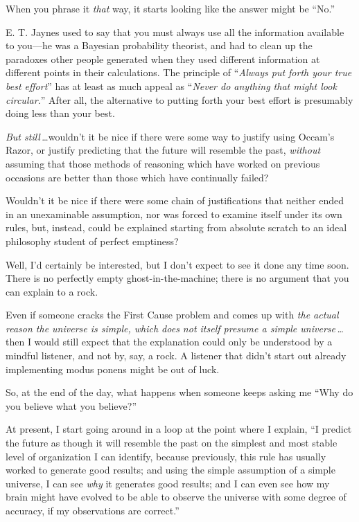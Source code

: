  When you phrase it \textit{that} way, it starts looking like the
answer might be ``No.''


 E. T. Jaynes used to say that you must always use all the
information available to you---he was a Bayesian probability theorist,
and had to clean up the paradoxes other people generated when they used
different information at different points in their calculations. The
principle of ``\textit{Always put forth your true best
effort}'' has at least as much appeal as
``\textit{Never do anything that might look
circular.}'' After all, the alternative to putting
forth your best effort is presumably doing less than your best.


 \textit{But still}\,\ldots wouldn't it be nice if
there were some way to justify using Occam's Razor, or
justify predicting that the future will resemble the past,
\textit{without} assuming that those methods of reasoning which have
worked on previous occasions are better than those which have
continually failed?


 Wouldn't it be nice if there were some chain of
justifications that neither ended in an unexaminable assumption, nor
was forced to examine itself under its own rules, but, instead, could
be explained starting from absolute scratch to an ideal philosophy
student of perfect emptiness?


 Well, I'd certainly be interested, but I
don't expect to see it done any time soon. There is no
perfectly empty ghost-in-the-machine; there is no argument that you can
explain to a rock.


 Even if someone cracks the First Cause problem and comes up with
\textit{the actual reason the universe is simple, which does not itself
presume a simple universe\,\ldots} then I would still expect that the
explanation could only be understood by a mindful listener, and not by,
say, a rock. A listener that didn't start out already
implementing modus ponens might be out of luck.


 So, at the end of the day, what happens when someone keeps asking
me ``Why do you believe what you
believe?''


 At present, I start going around in a loop at the point where I
explain, ``I predict the future as though it will
resemble the past on the simplest and most stable level of organization
I can identify, because previously, this rule has usually worked to
generate good results; and using the simple assumption of a simple
universe, I can see \textit{why} it generates good results; and I can
even see how my brain might have evolved to be able to observe the
universe with some degree of accuracy, if my observations are
correct.''


